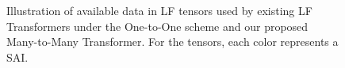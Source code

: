 \begin{figure}[t!]
    \caption{Illustration of available data in LF tensors used by existing LF Transformers under the One-to-One scheme and our proposed Many-to-Many Transformer. For the tensors, each color represents a SAI.}
    \label{fig:Cubes}
\end{figure}

